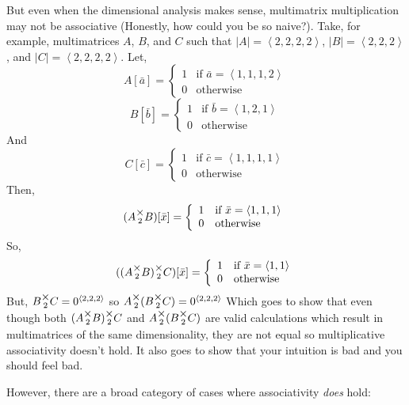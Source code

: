 \documentclass[12pt]{book}
\theoremstyle{plain}
\theoremstyle{definition}
\theoremstyle{ppart}
\theoremstyle{case}
\theoremstyle{solution}
\newcommand{\mmult}[1]{\text{\raisebox{1ex}{$\underset{#1}{\times}$}}}
\newcommand{\shape}[1]{\left|#1\right|}
\begin{document}
But even when the dimensional analysis makes sense, multimatrix multiplication
may not be associative (Honestly, how could you be so naive?). 
Take, for example, multimatrices $A$, $B$, and $C$ such
that $\shape{A} = \left<2,2,2,2\right>$, $\shape{B} = \left<2,2,2\right>$, and
$\shape{C} = \left<2,2,2,2\right>$. Let,
\[
 A[\bar{a}] = 
  \left\{
    \begin{array}{ll}
      1 & \mbox{if } \bar{a} = \left<1,1,1,2\right> \\
      0 & \mbox{otherwise}
    \end{array}
  \right.
\]
\[
 B[\bar{b}] = 
  \left\{
    \begin{array}{ll}
      1 & \mbox{if } \bar{b} = \left<1,2,1\right> \\
      0 & \mbox{otherwise}
    \end{array}
  \right.
\]
And
\[
 C[\bar{c}] = 
  \left\{
    \begin{array}{ll}
      1 & \mbox{if } \bar{c} = \left<1,1,1,1\right> \\
      0 & \mbox{otherwise}
    \end{array}
  \right.
\]
Then,
\[
 (A \mmult{2} B)[\bar{x}] = 
  \left\{
    \begin{array}{ll}
      1 & \mbox{if } \bar{x} = \left<1,1,1\right> \\
      0 & \mbox{otherwise}
    \end{array}
  \right.
\]
So,
\[
 ((A \mmult{2} B) \mmult{2} C)[\bar{x}] = 
  \left\{
    \begin{array}{ll}
      1 & \mbox{if } \bar{x} = \left<1,1\right> \\
      0 & \mbox{otherwise}
    \end{array}
  \right.
\]
But, $B \mmult{2} C = 0^{\left<2,2,2\right>}$ so $A \mmult{2} (B \mmult{2} C) = 0^{\left<2,2,2\right>}$
Which goes to show that even though both $(A \mmult{2} B) \mmult{2} C$ and
$A \mmult{2} (B \mmult{2} C)$ are valid calculations which result in multimatrices
of the same dimensionality, they are not equal so multiplicative associativity
doesn't hold. It also goes to show that your intuition is bad and you should feel bad.

However, there are a broad category of cases where associativity \textit{does} hold:
\end{document}
